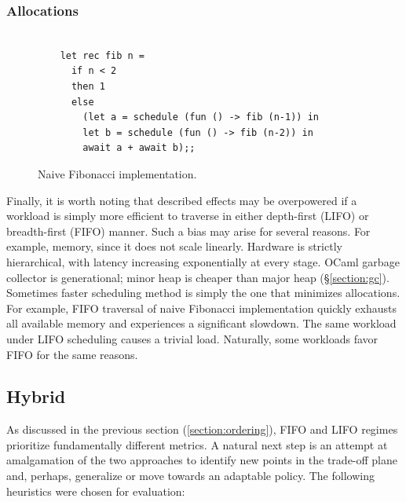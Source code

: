 \documentclass[12pt,a4paper,twoside]{report}
\begin{document}
\subsubsection{Allocations}

\begin{figure} 
    \centering
    \begin{verbatim}

    let rec fib n = 
      if n < 2 
      then 1 
      else
        (let a = schedule (fun () -> fib (n-1)) in
        let b = schedule (fun () -> fib (n-2)) in 
        await a + await b);;

    \end{verbatim}
    \caption{Naive Fibonacci implementation.}
    \label{fig:fib-pure}
\end{figure}

Finally, it is worth noting that described effects may be overpowered if a workload is simply more efficient to traverse in either depth-first (LIFO) or breadth-first (FIFO) manner. Such a bias may arise for several reasons. For example, memory, since it does not scale linearly. Hardware is strictly hierarchical, with latency increasing exponentially at every stage. OCaml garbage collector is generational; minor heap is cheaper than major heap (\S\ref{section:gc}). Sometimes faster scheduling method is simply the one that minimizes allocations. For example, FIFO traversal of naive Fibonacci implementation quickly exhausts all available memory and experiences a significant slowdown. The same workload under LIFO scheduling causes a trivial load. Naturally, some workloads favor FIFO for the same reasons.

\subsection{Hybrid}
As discussed in the previous section (\ref{section:ordering}), FIFO and LIFO regimes prioritize fundamentally different metrics. A natural next step is an attempt at amalgamation of the two approaches to identify new points in the trade-off plane and, perhaps, generalize or move towards an adaptable policy. The following heuristics were chosen for evaluation: 
\end{document}
